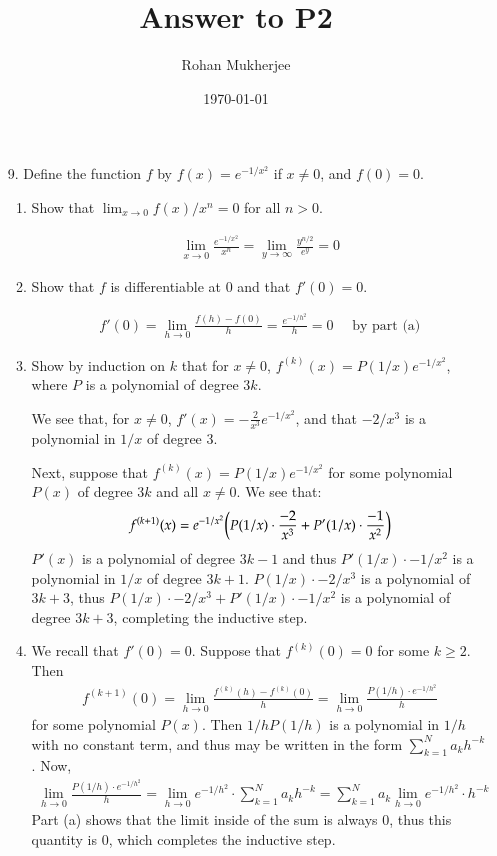 \documentclass[12pt]{article}
\title{Answer to P2}
\date{\today}
\author{Rohan Mukherjee}
\theoremstyle{definitionstyle}
\begin{document}
	\maketitle
	\begin{enumerate}[leftmargin=\labelsep]
		\item[9.] Define the function $f$ by $f(x) = e^{-1/x^2}$ if $x \neq 0$, and $f(0) = 0$. 
		\begin{enumerate}
			\item Show that $\lim_{x \to 0} f(x)/x^n = 0$ for all $n > 0$. 
			
			\begin{align*}
				\lim_{x \to 0} \frac{e^{-1/x^2}}{x^n} = \lim_{y \to \infty} \frac{y^{n/2}}{e^{y}} = 0
			\end{align*}
			
			\item Show that $f$ is differentiable at 0 and that $f'(0) = 0$.
			
			\begin{align*}
				f'(0) = \lim_{h \to 0} \frac{f(h)-f(0)}{h} = \frac{e^{-1/h^2}}{h} = 0 \quad \text{ by part (a)}
			\end{align*}
			
			\item Show by induction on $k$ that for $x \neq 0$, $f^{(k)}(x) = P(1/x)e^{-1/x^2}$, where $P$ is a polynomial of degree $3k$. 
			
			We see that, for $x \neq 0$, $f'(x) = -\frac{2}{x^3} e^{-1/x^2}$, and that $-2/x^3$ is a polynomial in $1/x$ of degree 3.
			
			Next, suppose that $f^{(k)}(x) = P(1/x)e^{-1/x^2}$ for some polynomial $P(x)$ of degree $3k$ and all $x \neq 0$. We see that:
			\begin{align*}
				f^{(k+1)}(x) = e^{-1/x^2} \qty(P(1/x) \cdot \frac{-2}{x^3} + P'(1/x) \cdot \frac{-1}{x^2})
			\end{align*}
			$P'(x)$ is a polynomial of degree $3k-1$ and thus $P'(1/x) \cdot -1/x^2$ is a polynomial in $1/x$ of degree $3k+1$. $P(1/x) \cdot -2/x^3$ is a polynomial of $3k+3$, thus $P(1/x) \cdot -2/x^3 + P'(1/x) \cdot -1/x^2$ is a polynomial of degree $3k+3$, completing the inductive step.
			
			\item We recall that $f'(0) = 0$. Suppose that $f^{(k)}(0) = 0$ for some $k \geq 2$. Then
			\begin{align*}
				f^{(k+1)}(0) = \lim_{h \to 0} \frac{f^{(k)}(h) - f^{(k)}(0)}{h} = \lim_{h \to 0} \frac{P(1/h) \cdot e^{-1/h^2}}{h}
			\end{align*}
			for some polynomial $P(x)$. Then $1/hP(1/h)$ is a polynomial in $1/h$ with no constant term, and thus may be written in the form $\sum_{k=1}^{N} a_kh^{-k}$. Now,
			\begin{align*}
				\lim_{h \to 0} \frac{P(1/h) \cdot e^{-1/h^2}}{h} = \lim_{h \to 0} e^{-1/h^2} \cdot \sum_{k=1}^{N} a_kh^{-k} = \sum_{k=1}^{N} a_k \lim_{h \to 0} e^{-1/h^2} \cdot h^{-k}
			\end{align*}
			Part (a) shows that the limit inside of the sum is always 0, thus this quantity is 0, which completes the inductive step.
		\end{enumerate}
	\end{enumerate}
\end{document}

